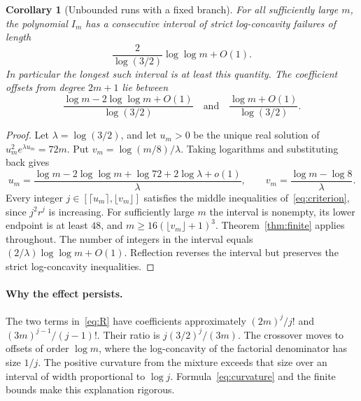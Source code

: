 \documentclass[11pt]{article}
\newtheorem{corollary}[theorem]{Corollary}
\begin{document}
\begin{corollary}[Unbounded runs with a fixed branch]\label{cor:run}
For all sufficiently large $m$, the polynomial $I_m$ has a consecutive
interval of strict log-concavity failures of length
\[
 \frac{2}{\log(3/2)}\log\log m+O(1).
\]
In particular the longest such interval is at least this quantity. The
coefficient offsets from degree $2m+1$ lie between
\[
 \frac{\log m-2\log\log m+O(1)}{\log(3/2)}
 \quad\text{and}\quad
 \frac{\log m+O(1)}{\log(3/2)}.
\]
\end{corollary}
\begin{proof}
Let $\lambda=\log(3/2)$, and let $u_m>0$ be the unique real solution of
$u_m^2e^{\lambda u_m}=72m$. Put $v_m=\log(m/8)/\lambda$.
Taking logarithms and substituting back gives
\[
 u_m=\frac{\log m-2\log\log m+\log72+2\log\lambda+o(1)}{\lambda},
 \qquad v_m=\frac{\log m-\log8}{\lambda}.
\]
Every integer $j\in[\lceil u_m\rceil,\lfloor v_m\rfloor]$ satisfies the
middle inequalities of~\eqref{eq:criterion}, since $j^2r^j$ is increasing.
For sufficiently large $m$ the interval is nonempty, its lower endpoint
is at least $48$, and $m\ge16(\lfloor v_m\rfloor+1)^3$.
Theorem~\ref{thm:finite} applies throughout. The number of integers in the
interval equals $(2/\lambda)\log\log m+O(1)$. Reflection reverses the
interval but preserves the strict log-concavity inequalities.
\end{proof}

\paragraph{Why the effect persists.}
The two terms in~\eqref{eq:R} have coefficients approximately
$(2m)^j/j!$ and $(3m)^{j-1}/(j-1)!$. Their ratio is
$j(3/2)^j/(3m)$. The crossover moves to offsets of order $\log m$,
where the log-concavity of the factorial denominator has size $1/j$.
The positive curvature from the mixture exceeds that size over an interval
of width proportional to $\log j$. Formula~\eqref{eq:curvature} and the
finite bounds make this explanation rigorous.
\end{document}
